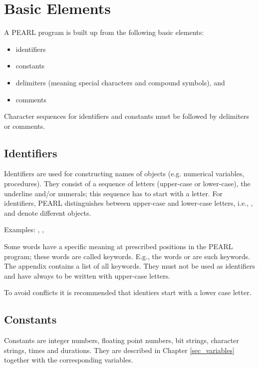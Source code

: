 \section{Basic Elements}    %

A PEARL program is built up from the following basic elements:

\begin{itemize}
\item identifiers
\item constants
\item delimiters (meaning special characters and compound symbols), and
\item comments
\end{itemize}

Character sequences for identifiers and constants must be followed by
delimiters or comments.

\subsection{Identifiers}   %

Identifiers are used for constructing names of objects (e.g. numerical
variables, procedures). They consist of a sequence of letters
(upper-case or lower-case), the underline and/or numerals; this sequence
has to start with a letter. For identifiers, PEARL distinguishes between
upper-case and lower-case letters, i.e., ,  and 
 denote different objects.

Examples: , , 

Some words have a specific meaning at prescribed positions in the PEARL
program; these words are called keywords. E.g., the words  or 
are such keywords. The appendix contains a list of all keywords. They
must not be used as identifiers and have always to be written with
upper-case letters.

To avoid conflicts it is recommended that identiers start with a lower
case letter.

\subsection{Constants}   %

Constants are integer numbers, floating point numbers, bit strings,
character strings, times and durations. They are described in Chapter 
\ref{sec_variables}
together with the corresponding variables.

